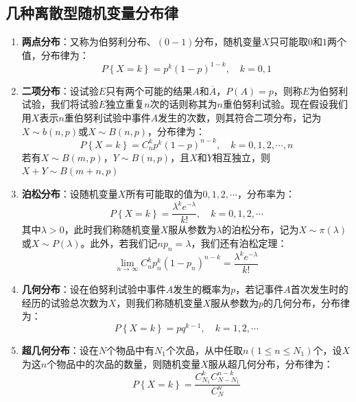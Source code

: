 \documentclass[12pt,a4paper,UTF8]{book}
\begin{document}
\subsection{几种离散型随机变量分布律}
\begin{enumerate}
\item \textbf{两点分布}：又称为伯努利分布、$(0-1)$分布，随机变量$X$只可能取$0$和$1$两个值，分布律为：
\[P\left\{X=k\right\}=p^k\left(1-p\right)^{1-k},\quad k=0,1\]
\item \textbf{二项分布}：设试验$E$只有两个可能的结果$A$和$\overline{A}$，$P\left(A\right)=p$，则称$E$为伯努利试验，我们将试验$E$独立重复$n$次的话则称其为$n$重伯努利试验。现在假设我们用$X$表示$n$重伯努利试验中事件$A$发生的次数，则其符合二项分布，记为$X\sim b\left(n,p\right)$或$X\sim B\left(n,p\right)$，分布律为：
\[P\left\{X=k\right\}=C_{n}^{k}p^k\left(1-p\right)^{n-k},\quad k=0,1,2,\cdots,n\]
若有$X\sim B\left(m,p\right)$，$Y\sim B\left(n,p\right)$，且$X$和$Y$相互独立，则$X+Y\sim B\left(m+n,p\right)$
\item \textbf{泊松分布}：设随机变量$X$所有可能取的值为$0,1,2,\cdots$，分布率为：
\[P\left\{X=k\right\}=\frac{\lambda^ke^{-\lambda}}{k!},\quad k=0,1,2,\cdots\]
其中$\lambda>0$，此时我们称随机变量$X$服从参数为$\lambda$的泊松分布，记为$X\sim \pi\left(\lambda\right)$或$X\sim P\left(\lambda\right)$。此外，若我们记$np_n=\lambda$，我们还有泊松定理：
\[\lim\limits_{n\to\infty}C_{n}^{k}p_n^k\left(1-p_n\right)^{n-k}=\frac{\lambda^ke^{-\lambda}}{k!}\]
\item \textbf{几何分布}：设在伯努利试验中事件$A$发生的概率为$p$，若记事件$A$首次发生时的经历的试验总次数为$X$，则我们称随机变量$X$服从参数为$p$的几何分布，分布律为：
\[P\left\{X=k\right\}=pq^{k-1},\quad k=1,2,\cdots\]
\item \textbf{超几何分布}：设在$N$个物品中有$N_1$个次品，从中任取$n(1\leq n\leq N_1)$个，设$X$为这$n$个物品中的次品的数量，则随机变量$X$服从超几何分布，分布律为：
\[P\left\{X=k\right\}=\frac{C_{N_1}^kC_{N-N_1}^{n-k}}{C_N^n}\]
\end{enumerate}
\end{document}
